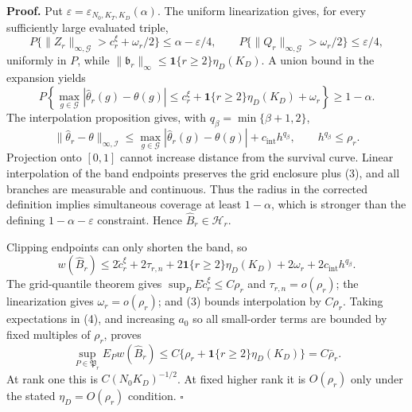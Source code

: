 \textbf{Proof.}
Put \(\varepsilon=\varepsilon_{N_0,K_T,K_D}(\alpha)\). The uniform linearization gives, for every sufficiently large evaluated triple,
\[
 P\{\|Z_r\|_{\infty,\mathcal G}>c_r^\xi+\omega_r/2\}
 \le\alpha-\varepsilon/4,\qquad
 P\{\|Q_r\|_{\infty,\mathcal G}>\omega_r/2\}\le\varepsilon/4, \tag{1}
\]
uniformly in \(P\), while \(\|\mathfrak b_r\|_\infty\le\mathbf1\{r\ge2\}\eta_D(K_D)\). A union bound in the expansion yields
\[
 P\left\{\max_{g\in\mathcal G}|\widehat\theta_r(g)-\theta(g)|
 \le c_r^\xi+\mathbf1\{r\ge2\}\eta_D(K_D)+\omega_r\right\}
 \ge1-\alpha.                                             \tag{2}
\]
The interpolation proposition gives, with \(q_\beta=\min\{\beta+1,2\}\),
\[
 \|\widehat\theta_r-\theta\|_{\infty,\mathcal I}
 \le\max_{g\in\mathcal G}|\widehat\theta_r(g)-\theta(g)|
 +c_{\mathrm{int}}h^{q_\beta},\qquad h^{q_\beta}\le\rho_r. \tag{3}
\]
Projection onto \([0,1]\) cannot increase distance from the survival curve. Linear interpolation of the band endpoints preserves the grid enclosure plus (3), and all branches are measurable and continuous. Thus the radius in the corrected definition implies simultaneous coverage at least \(1-\alpha\), which is stronger than the defining \(1-\alpha-\varepsilon\) constraint. Hence \(\widehat B_r\in\mathcal H_r\).

Clipping endpoints can only shorten the band, so
\[
 w(\widehat B_r)\le2\widetilde c_r^\xi+2\tau_{r,n}
 +2\mathbf1\{r\ge2\}\eta_D(K_D)+2\omega_r
 +2c_{\mathrm{int}}h^{q_\beta}.                           \tag{4}
\]
The grid-quantile theorem gives \(\sup_PE\widetilde c_r^\xi\le C\rho_r\) and \(\tau_{r,n}=o(\rho_r)\); the linearization gives \(\omega_r=o(\rho_r)\); and (3) bounds interpolation by \(C\rho_r\). Taking expectations in (4), and increasing \(a_0\) so all small-order terms are bounded by fixed multiples of \(\rho_r\), proves
\[
 \sup_{P\in\mathfrak P_r}E_Pw(\widehat B_r)
 \le C\{\rho_r+\mathbf1\{r\ge2\}\eta_D(K_D)\}=C\bar\rho_r. \tag{5}
\]
At rank one this is \(C(N_0K_D)^{-1/2}\). At fixed higher rank it is \(O(\rho_r)\) only under the stated \(\eta_D=O(\rho_r)\) condition. \(\square\)